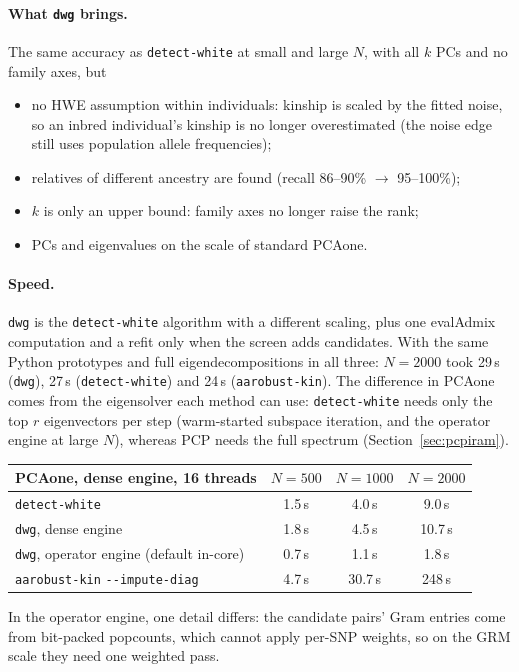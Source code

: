 \documentclass[11pt,a4paper]{article}
\newcommand{\opt}[1]{\texttt{-{}-#1}}
\begin{document}
\paragraph{What \texttt{dwg} brings.} The same accuracy as
\texttt{detect-white} at small and large $N$, with all $k$ PCs and no family
axes, but
\begin{itemize}
  \item no HWE assumption within individuals: kinship is scaled by the fitted
    noise, so an inbred individual's kinship is no longer overestimated (the
    noise edge still uses population allele frequencies);
  \item relatives of different ancestry are found (recall 86--90\% $\to$
    95--100\%);
  \item $k$ is only an upper bound: family axes no longer raise the rank;
  \item PCs and eigenvalues on the scale of standard PCAone.
\end{itemize}

\paragraph{Speed.} \texttt{dwg} is the \texttt{detect-white} algorithm with a
different scaling, plus one evalAdmix computation and a refit only when the
screen adds candidates. With the same Python prototypes and
full eigendecompositions in all three: $N=2000$ took 29\,s (\texttt{dwg}),
27\,s (\texttt{detect-white}) and 24\,s (\texttt{aarobust-kin}). The
difference in PCAone comes from the eigensolver each method can use:
\texttt{detect-white} needs only the top $r$ eigenvectors per step
(warm-started subspace iteration, and the operator engine at large $N$),
whereas PCP needs the full spectrum (Section~\ref{sec:pcpiram}).
\begin{center}\small
\begin{tabular}{@{}lccc@{}}
\toprule
PCAone, dense engine, 16 threads & $N=500$ & $N=1000$ & $N=2000$ \\
\midrule
\texttt{detect-white} & 1.5\,s & 4.0\,s & 9.0\,s \\
\texttt{dwg}, dense engine & 1.8\,s & 4.5\,s & 10.7\,s \\
\texttt{dwg}, operator engine (default in-core) & 0.7\,s & 1.1\,s & 1.8\,s \\
\texttt{aarobust-kin} \opt{impute-diag} & 4.7\,s & 30.7\,s & 248\,s \\
\bottomrule
\end{tabular}
\end{center}
In the operator engine, one detail differs: the candidate pairs' Gram entries
come from bit-packed popcounts, which cannot apply per-SNP weights, so on the
GRM scale they need one weighted pass.
\end{document}
